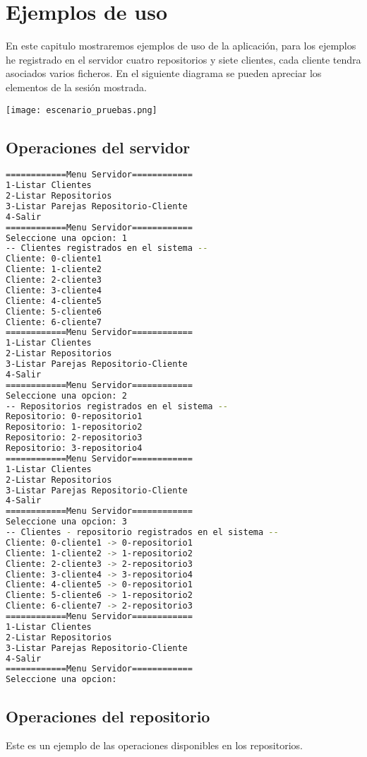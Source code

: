 \chapter{Ejemplos de uso}

En este capitulo mostraremos ejemplos de uso de la aplicación, para los ejemplos he registrado en el servidor cuatro repositorios y siete clientes, cada cliente tendra asociados varios ficheros.
En el siguiente diagrama se pueden apreciar los elementos de la sesión mostrada.

\texttt{[image: escenario\_pruebas.png]}

\section{Operaciones del servidor}
\begin{lstlisting}[language=bash,frame=single,texcl=true,basicstyle=\small]
============Menu Servidor============
1-Listar Clientes
2-Listar Repositorios
3-Listar Parejas Repositorio-Cliente
4-Salir
============Menu Servidor============
Seleccione una opcion: 1   
-- Clientes registrados en el sistema --
Cliente: 0-cliente1
Cliente: 1-cliente2
Cliente: 2-cliente3
Cliente: 3-cliente4
Cliente: 4-cliente5
Cliente: 5-cliente6
Cliente: 6-cliente7
============Menu Servidor============
1-Listar Clientes
2-Listar Repositorios
3-Listar Parejas Repositorio-Cliente
4-Salir
============Menu Servidor============
Seleccione una opcion: 2
-- Repositorios registrados en el sistema --
Repositorio: 0-repositorio1
Repositorio: 1-repositorio2
Repositorio: 2-repositorio3
Repositorio: 3-repositorio4
============Menu Servidor============
1-Listar Clientes
2-Listar Repositorios
3-Listar Parejas Repositorio-Cliente
4-Salir
============Menu Servidor============
Seleccione una opcion: 3
-- Clientes - repositorio registrados en el sistema --
Cliente: 0-cliente1 -> 0-repositorio1
Cliente: 1-cliente2 -> 1-repositorio2
Cliente: 2-cliente3 -> 2-repositorio3
Cliente: 3-cliente4 -> 3-repositorio4
Cliente: 4-cliente5 -> 0-repositorio1
Cliente: 5-cliente6 -> 1-repositorio2
Cliente: 6-cliente7 -> 2-repositorio3
============Menu Servidor============
1-Listar Clientes
2-Listar Repositorios
3-Listar Parejas Repositorio-Cliente
4-Salir
============Menu Servidor============
Seleccione una opcion: 
\end{lstlisting}


\section{Operaciones del repositorio}
Este es un ejemplo de las operaciones disponibles en los repositorios.
